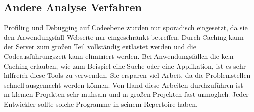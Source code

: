 \subsection{Andere Analyse Verfahren}
Profiling und Debugging auf Codeebene wurden nur sporadisch eingesetzt, da sie den Anwendungsfall Webseite nur eingeschränkt betreffen. Durch Caching kann der Server zum großen Teil vollständig entlastet werden und die Codeausführungszeit kann eliminiert werden. Bei Anwendungsfällen die kein Caching erlauben, wie zum Beispiel eine Suche oder eine Applikation, ist es sehr hilfreich diese Tools zu verwenden. Sie ersparen viel Arbeit, da die Problemstellen schnell ausgemacht werden können. Von Hand diese Arbeiten durchzuführen ist in kleinen Projekten sehr mühsam und in großen Projekten fast unmöglich. Jeder Entwickler sollte solche Programme in seinem Repertoire haben.

